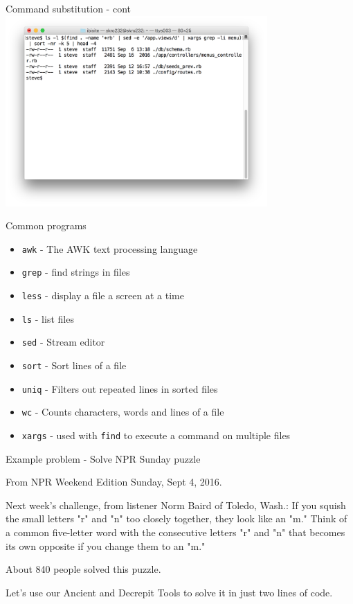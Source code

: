 \documentclass[t]{beamer}
\begin{document}
\begin{frame}{Command substitution - cont}
  \includegraphics[width=10cm,scale=0.4]{images/cs-2.png}
  \note{}
\end{frame}

\begin{frame}{Common programs}
  \begin{itemize}
  \item \texttt{awk} - The AWK text processing language
    \pause
  \item \texttt{grep} - find strings in files
    \pause
  \item \texttt{less} - display a file a screen at a time
    \pause
  \item \texttt{ls} - list files
    \pause
  \item \texttt{sed} - Stream editor
    \pause
  \item \texttt{sort} - Sort lines of a file
    \pause
  \item \texttt{uniq} - Filters out repeated lines in sorted files
    \pause
  \item \texttt{wc} - Counts characters, words and lines of a file
    \pause
  \item \texttt{xargs} - used with \texttt{find} to execute a command on
    multiple files
  \end{itemize}
  \note{}
\end{frame}

\begin{frame}{Example problem - Solve NPR Sunday puzzle}

  From NPR Weekend Edition Sunday, Sept 4, 2016.

  \bigskip
  Next week's challenge, from listener Norm Baird of Toledo, Wash.: If
  you squish the small letters "r" and "n" too closely together, they
  look like an "m." Think of a common five-letter word with the
  consecutive letters "r" and "n" that becomes its own opposite if you
  change them to an "m."
  
  \bigskip
  About 840 people solved this puzzle.
  
  \bigskip
  Let's use our Ancient and Decrepit Tools to solve it in just two
  lines of code.
  \note{}
\end{frame}
\end{document}

